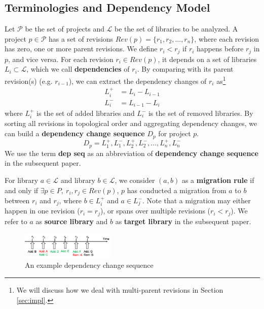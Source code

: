 \documentclass[conference, 10pt]{IEEEtran}
\begin{document}
\subsection{Terminologies and Dependency Model}
\label{subsec:bg-terminoligies}

Let $\mathcal{P}$ be the set of projects and $\mathcal{L}$ be the set of libraries to be analyzed. 
A project $p\in\mathcal{P}$ has a set of revisions $Rev(p)=\{r_1,r_2,...,r_n\}$, where each revision has zero, one or more parent revisions. 
We define $r_i < r_j$ if $r_i$ happens before $r_j$ in $p$, and vice versa.
For each revision $r_i \in Rev(p)$, it depends on a set of libraries $L_i \subset \mathcal{L}$, which we call \textbf{dependencies} of $r_i$. 
By comparing with its parent revision(s) (e.g. $r_{i-1}$), we can extract the dependency changes of $r_i$ as\footnote{We will discuss how we deal with multi-parent revisions in Section \ref{sec:impl}.}
\begin{align}
L_i^+ &= L_i - L_{i-1} \\
L_i^- &= L_{i-1} - L_i 
\end{align}
where $ L_i^+$ is the set of added libraries and $ L_i^-$ is the set of removed libraries. By sorting all revisions in topological order and aggregating dependency changes, we can build a \textbf{dependency change sequence} $D_p$ for project $p$.
\begin{equation}
    D_p= L_1^+, L_1^-, L_2^+,  L_2^-, ...,  L_n^+,  L_n^- 
\end{equation}
We use the term \textbf{dep seq} as an abbreviation of \textbf{dependency change sequence} in the subsequent paper.

For library $a\in\mathcal{L}$ and library $b\in\mathcal{L}$, we consider $(a,b)$ as a \textbf{migration rule} if and only if $\exists p \in P,\ r_i, r_j \in Rev(p)$, $p$ has conducted a migration from $a$ to $b$ between $r_i$ and $r_j$, where $b \in  L_i^+$ and $a \in  L_j^-$. 
Note that a migration may either happen in one revision ($r_i = r_j$), or spans over multiple revisions ($r_i < r_j$). 
We refer to $a$ as \textbf{source library} and $b$ as \textbf{target library} in the subsequent paper.

\begin{figure}
  \centering
  \includegraphics[width=0.4\textwidth]{fig/depseq.png}
  \caption{An example dependency change sequence}
  \label{fig:depseq}
\end{figure}
\end{document}
